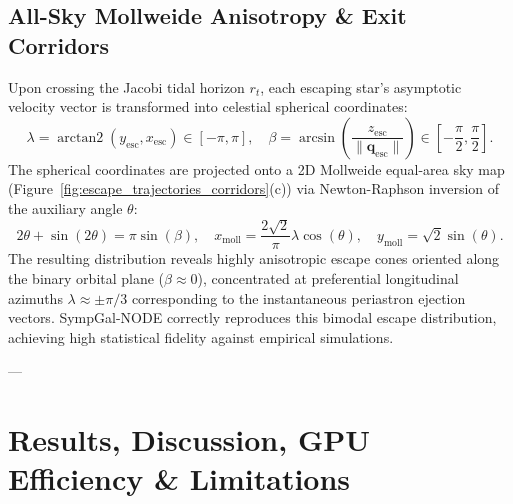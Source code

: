 \documentclass[preprint,12pt,3p]{elsarticle}
\begin{document}
\subsection{All-Sky Mollweide Anisotropy \& Exit Corridors}
Upon crossing the Jacobi tidal horizon $r_t$, each escaping star's asymptotic velocity vector is transformed into celestial spherical coordinates:
\begin{equation}
\lambda = \operatorname{arctan2}(y_{\mathrm{esc}}, x_{\mathrm{esc}}) \in [-\pi, \pi], \quad \beta = \arcsin\left( \frac{z_{\mathrm{esc}}}{\|\bm{q}_{\mathrm{esc}}\|} \right) \in \left[-\frac{\pi}{2}, \frac{\pi}{2}\right].
\label{eq:celestial_coords}
\end{equation}
The spherical coordinates are projected onto a 2D Mollweide equal-area sky map (Figure~\ref{fig:escape_trajectories_corridors}(c)) via Newton-Raphson inversion of the auxiliary angle $\theta$:
\begin{equation}
2\theta + \sin(2\theta) = \pi \sin(\beta), \quad x_{\mathrm{moll}} = \frac{2\sqrt{2}}{\pi} \lambda \cos(\theta), \quad y_{\mathrm{moll}} = \sqrt{2} \sin(\theta).
\label{eq:mollweide_projection}
\end{equation}
The resulting distribution reveals highly anisotropic escape cones oriented along the binary orbital plane ($\beta \approx 0$), concentrated at preferential longitudinal azimuths $\lambda \approx \pm \pi/3$ corresponding to the instantaneous periastron ejection vectors. SympGal-NODE correctly reproduces this bimodal escape distribution, achieving high statistical fidelity against empirical simulations.

---

\section{Results, Discussion, GPU Efficiency \& Limitations}\label{sec:discussion}
\end{document}
